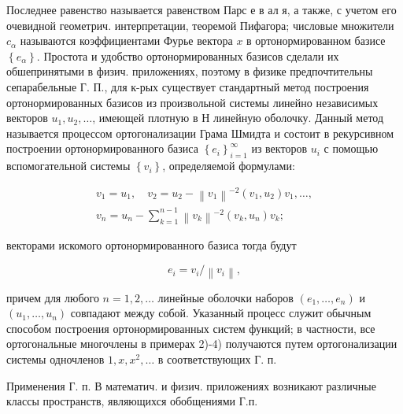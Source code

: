 \documentclass[10pt]{article}
\begin{document}
Последнее равенство называется равенством Парс е в ал я, а также, с учетом его очевидной геометрич. интерпретации, теоремой Пифагора; числовые множители $c_{\alpha}$ называются коэффициентами Фурье вектора $x$ в ортонормированном базисе $\left\{e_{\alpha}\right\}$. Простота и удобство ортонормированных базисов сделали их обшепринятыми в физич. приложениях, поэтому в физике предпочтительны сепарабельные Г. П., для к-рых существует стандартный метод построения ортонормированных базисов из произвольной системы линейно независимых векторов $u_{1}, u_{2}, \ldots$, имеющей плотную в $Н$ линейную оболочку. Данный метод называется процессом ортогонализации Грама Шмидта и состоит в рекурсивном построении ортонормированного базиса $\left\{e_{i}\right\}_{i=1}^{\infty}$ из векторов $u_{i}$ с помощью вспомогательной системы $\left\{v_{i}\right\}$, определяемой формулами:



\[

\begin{gathered}

v_{1}=u_{1}, \quad v_{2}=u_{2}-\left\|v_{1}\right\|^{-2}\left(v_{1}, u_{2}\right) v_{1}, \ldots, \\

v_{n}=u_{n}-\sum_{k=1}^{n-1}\left\|v_{k}\right\|^{-2}\left(v_{k}, u_{n}\right) v_{k} ;

\end{gathered}

\]



векторами искомого ортонормированного базиса тогда будут



\[

e_{i}=v_{i} /\left\|v_{i}\right\|,

\]



причем для любого $n=1,2, \ldots$ линейные оболочки наборов $\left(e_{1}, \ldots, e_{n}\right)$ и $\left(u_{1}, \ldots, u_{n}\right)$ совпадают между собой. Указанный процесс служит обычным способом построения ортонормированных систем функций; в частности, все ортогональные многочлены в примерах 2)-4) получаются путем ортогонализации системы одночленов $1, x, x^{2}, \ldots$ в соответствующих Г. п.



Применения Г. п. В математич. и физич. приложениях возникают различные классы пространств, являющихся обобщениями Г.п.
\end{document}
